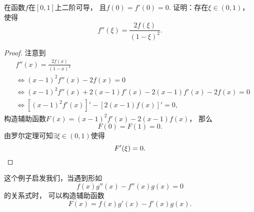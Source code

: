 \begin{example}
在函数\(f\)在\([0,1]\)上二阶可导，
且\(f(0) = f'(0) = 0\).
证明：存在\(\xi\in(0,1)\)，
使得\[
	f''(\xi) = \frac{2 f(\xi)}{(1-\xi)^2}.
\]
\begin{proof}
注意到\begin{align*}
	&f''(x) = \frac{2 f(x)}{(1-x)^2} \\
	&\iff
	(x-1)^2 f''(x) - 2 f(x) = 0 \\
	&\iff
	(x-1)^2 f''(x) + 2 (x-1) f'(x) - 2 (x-1) f'(x) - 2 f(x) = 0 \\
	&\iff
	[(x-1)^2 f'(x)]' - [2 (x-1) f(x)]' = 0,
\end{align*}
构造辅助函数\(F(x) = (x-1)^2 f'(x) - 2 (x-1) f(x)\)，
那么\[
	F(0) = F(1) = 0.
\]
由罗尔定理可知\(\exists\xi\in(0,1)\)使得\[
	F'(\xi) = 0.
	\qedhere
\]
\end{proof}
\end{example}
\begin{remark}
这个例子启发我们，当遇到形如\[
	f(x) g''(x) - f''(x) g(x) = 0
\]的关系式时，
可以构造辅助函数\[
	F(x) = f(x) g'(x) - f'(x) g(x).
\]
\end{remark}

